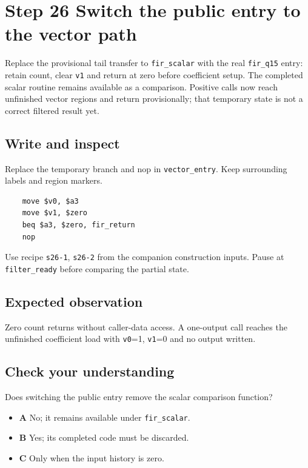 \section{Step 26 Switch the public entry to the vector path}\label{fir-s26}

Replace the provisional tail transfer to \texttt{fir\_scalar} with the real \texttt{fir\_q15} entry: retain count, clear \texttt{v1} and return at zero before coefficient setup. The completed scalar routine remains available as a comparison. Positive calls now reach unfinished vector regions and return provisionally; that temporary state is not a correct filtered result yet.

\subsection{Write and inspect}
Replace the temporary branch and nop in \texttt{vector\_entry}. Keep surrounding labels and region markers.

\begin{verbatim}
    move $v0, $a3
    move $v1, $zero
    beq $a3, $zero, fir_return
    nop
\end{verbatim}
Use recipe \texttt{s26-1}, \texttt{s26-2} from the companion construction inputs. Pause at \texttt{filter\_ready} before comparing the partial state.

\subsection{Expected observation}
Zero count returns without caller-data access. A one-output call reaches the unfinished coefficient load with \texttt{v0}=1, \texttt{v1}=0 and no output written.

\subsection{Check your understanding}
Does switching the public entry remove the scalar comparison function?

\begin{itemize}
  \item \textbf{A} No; it remains available under \texttt{fir\_scalar}.
  \item \textbf{B} Yes; its completed code must be discarded.
  \item \textbf{C} Only when the input history is zero.
\end{itemize}
